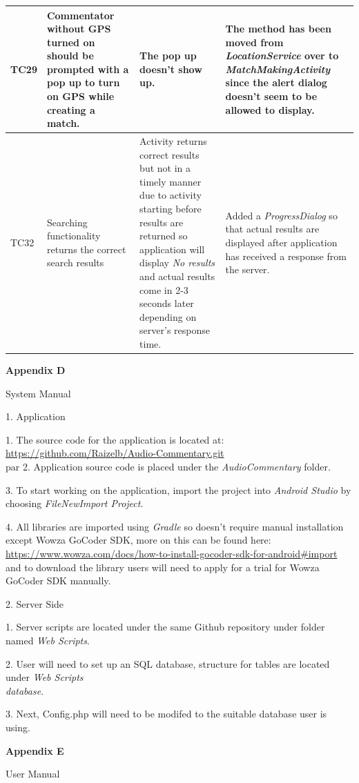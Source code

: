 \documentclass{article}
\begin{document}
\begin{flushleft}
\begin{longtable}[l]{|p{1.2cm}|p{4cm}|p{4cm}|p{5cm}|}
\hline
TC29 & Commentator without GPS turned on should be prompted with a pop up to turn on GPS while creating a match. & The pop up doesn't show up. & The method has been moved from \textit{LocationService} over to \textit{MatchMakingActivity} since the alert dialog doesn't seem to be allowed to display.\\
\hline
TC32 & Searching functionality returns the correct search results & Activity returns correct results but not in a timely manner due to activity starting before results are returned so application will display \textit{No results} and actual results come in 2-3 seconds later depending on server's response time. & Added a \textit{ProgressDialog} so that actual results are displayed after application has received a response from the server.\\
\hline
\end{longtable}
{\Large \textbf{Appendix D}}\par
{\huge System Manual}\par
{\large 1. Application}\par
1. The source code for the application is located at: \url{https://github.com/Raizelb/Audio-Commentary.git}\\par
2. Application source code is placed under the \textit{AudioCommentary} folder.\par
3. To start working on the application, import the project into \textit{Android Studio} by choosing \textit{File\textrightarrow New\textrightarrow Import Project}.\par
4. All libraries are imported using \textit{Gradle} so doesn't require manual installation except Wowza GoCoder SDK, more on this can be found here: \url{https://www.wowza.com/docs/how-to-install-gocoder-sdk-for-android#import} and to download the library users will need to apply for a trial for Wowza GoCoder SDK manually.\par
{\large 2. Server Side}\par
1. Server scripts are located under the same Github repository under folder named \textit{Web Scripts}.\par
2. User will need to set up an SQL database, structure for tables are located under \textit{Web Scripts\\database}.\par
3. Next, Config.php will need to be modifed to the suitable database user is using.\par
{\Large \textbf{Appendix E}}\par
{\huge User Manual}\par

\end{flushleft}
\end{document}

